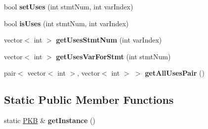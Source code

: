 \begin{DoxyCompactItemize}
\item 
\hypertarget{class_p_k_b_a93cc07428451daccf6536f17993e547f}{}bool {\bfseries set\+Uses} (int stmt\+Num, int var\+Index)\label{class_p_k_b_a93cc07428451daccf6536f17993e547f}

\item 
\hypertarget{class_p_k_b_a9172069feab68ac212353a300d91a135}{}bool {\bfseries is\+Uses} (int stmt\+Num, int var\+Index)\label{class_p_k_b_a9172069feab68ac212353a300d91a135}

\item 
\hypertarget{class_p_k_b_a70940a7f83e7536378d9cb19ef4e34c0}{}vector$<$ int $>$ {\bfseries get\+Uses\+Stmt\+Num} (int var\+Index)\label{class_p_k_b_a70940a7f83e7536378d9cb19ef4e34c0}

\item 
\hypertarget{class_p_k_b_ae638fd3055b5c863a2472ba2cf52a49a}{}vector$<$ int $>$ {\bfseries get\+Uses\+Var\+For\+Stmt} (int stmt\+Num)\label{class_p_k_b_ae638fd3055b5c863a2472ba2cf52a49a}

\item 
\hypertarget{class_p_k_b_a3418fe748fa2cad0bb19f829420f69ef}{}pair$<$ vector$<$ int $>$, vector$<$ int $>$ $>$ {\bfseries get\+All\+Uses\+Pair} ()\label{class_p_k_b_a3418fe748fa2cad0bb19f829420f69ef}

\end{DoxyCompactItemize}
\subsection*{Static Public Member Functions}
\begin{DoxyCompactItemize}
\item 
\hypertarget{class_p_k_b_af2a7def736f28e61707ae72d608d2caf}{}static \hyperlink{class_p_k_b}{P\+K\+B} \& {\bfseries get\+Instance} ()\label{class_p_k_b_af2a7def736f28e61707ae72d608d2caf}

\end{DoxyCompactItemize}
